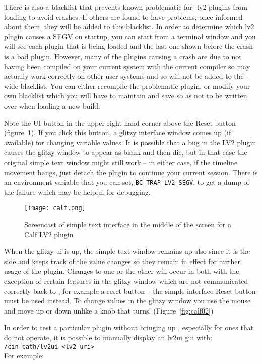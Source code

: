 There is also a blacklist that prevents known problematic-for-\CGG{} lv2 plugins from loading to avoid crashes. If others are found to have problems, once informed about them, they will be added to this blacklist. In order to determine which lv2 plugin causes a SEGV on \CGG{} startup, you can start from a terminal window and you will see each plugin that is being loaded and the last one shown before the crash is a bad plugin. However, many of the plugins causing a crash are due to not having been compiled on your current system with the current compiler so may actually work correctly on other user systems and so will not be added to the \CGG{}-wide blacklist. You can either recompile the problematic plugin, or modify your own blacklist which you will have to maintain and save so as not to be written over when loading a new build.

Note the UI button in the upper right hand corner above the Reset button (figure~\ref{fig:calf}). If you click this button, a glitzy interface window comes up (if available) for changing variable values. It is possible that a bug in the LV2 plugin causes the glitzy window to appear as blank and then die, but in that case the original simple text window might still work -- in either case, if the timeline movement hangs, just detach the plugin to continue your current session. There is an environment variable that you can set,  \texttt{BC\_TRAP\_LV2\_SEGV}, to get a dump of the failure which may be helpful for debugging.

\begin{figure}[htpb]
    \centering
    \texttt{[image: calf.png]}
    \caption{Screencast of simple text interface in the middle of the screen for a Calf LV2 plugin}
    \label{fig:calf}
\end{figure}

When the glitzy ui is up, the simple text window remains up also since it is the \CGG{} side and keeps track of the value changes so they remain in effect for further usage of the plugin. Changes to one or the other will occur in both with the exception of certain features in the glitzy window which are not communicated correctly back to \CGG{}; for example a reset button -- the simple interface Reset button must be used instead. To change values in the glitzy window you use the mouse and move up or down unlike a knob that turns! (Figure~\ref{fig:calf02})

In order to test a particular plugin without bringing up \CGG{}, especially for ones that do not operate, it is possible to manually display an lv2ui gui with: \\
\texttt{/cin-path/lv2ui <lv2-uri>} \\
For example:

